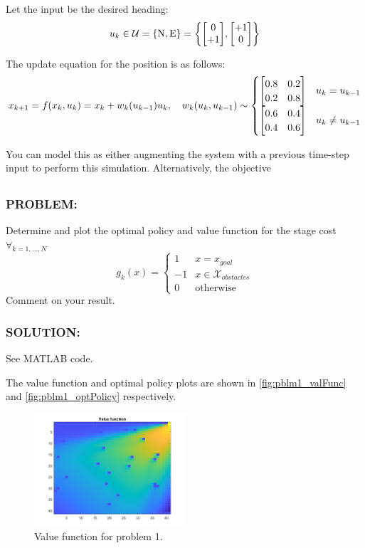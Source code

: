 \documentclass[]{article}
\newcommand{\Problem}{\subsubsection*{\textbf{PROBLEM:}}}
\newcommand{\Solution}{\subsubsection*{\textbf{SOLUTION:}}}
\begin{document}
Let the input be the desired heading:\[
    u_k \in \mathcal{U} = \qty{\text{N}, \text{E}} = \qty{\mqty[0\\+1], \mqty[+1\\0]}
\]

The update equation for the position is as follows:\[
    x_{k+1} = f(x_k,u_k) = x_k + w_k(u_{k-1}) u_{k}, 
    \quad w_k(u_{k},u_{k-1}) \sim \begin{cases}
        \mqty[0.8 & 0.2 \\ 0.2 & 0.8] & u_{k} = u_{k-1}\\
        \mqty[0.6 & 0.4 \\ 0.4 & 0.6] & u_{k} \neq u_{k-1}
    \end{cases}
\]

You can model this as either augmenting the system with a previous time-step input to perform this simulation. 
Alternatively, the objective 

\subsection{}
\Problem
Determine and plot the optimal policy and value function for the stage cost $\forall_{k = 1,\dots, N}$ \[
    g_k(x) = \begin{cases}
        1 & x = x_{goal}\\%
        -1 & x \in \mathcal{X}_{obstacles}\\%
        0 & \text{otherwise}
    \end{cases}
\]
Comment on your result.
\Solution

See MATLAB code.

The value function and optimal policy plots are shown in \autoref{fig:pblm1_valFunc} and \autoref{fig:pblm1_optPolicy} respectively.

\begin{figure}[h]
    \centering
    \includegraphics[width=0.5\textwidth]{figs/pblm1_valFunc.png}
    \caption{Value function for problem 1.}
    \label{fig:pblm1_valFunc}
\end{figure}
\end{document}
